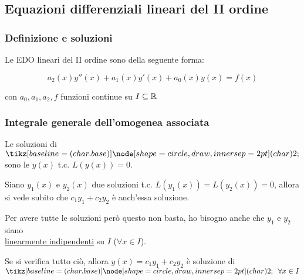 
\subsection{Equazioni differenziali lineari del II ordine}

\subsubsection{Definizione e soluzioni}

Le EDO lineari del II ordine sono della seguente forma:

\[
    a_2(x)y''(x) + a_1(x) y'(x) + a_0(x) y(x) = f(x)
\]

con \(a_0,a_1,a_2,f\) funzioni continue su \(I \subseteq \mathbb{R} \)




\subsubsection*{Integrale generale dell'omogenea associata}

Le soluzioni di \(\circled{2}\) sono le \(y(x)\) t.c. \(L(y(x)) = 0\).

Siano \(y_1(x)\) e \(y_2(x)\) due soluzioni t.c. \(L(y_1(x)) = L(y_2(x)) = 0\),
allora si vede subito che \(c_1y_1 + c_2y_2\) è anch'essa soluzione.

Per avere tutte le soluzioni però questo non basta, ho bisogno anche che \(y_1\) e \(y_2\) siano \\
\underline{linearmente indipendenti} su \(I\) (\(\forall x \in I\)).

Se si verifica tutto ciò, allora \(y(x) = c_1y_1 + c_2y_2\) è soluzione di \(\circled{2}\ \ \forall x \in I\)

